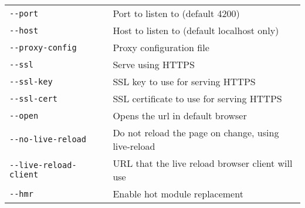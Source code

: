 \documentclass[8pt]{extarticle} %
\begin{document}
\begin{multicols}{3}
  \begin{tabular}{L{0.35\linewidth} L{0.65\linewidth}}
    \tt -{}-port \itt{} & \small Port to listen to (default 4200)\\
    \tt -{}-host \itt{} & \small Host to listen to (default localhost only)\\
    \tt -{}-proxy-config  & \small Proxy configuration file \\
    \tt -{}-ssl & \small Serve using HTTPS \\
    \tt -{}-ssl-key \itt{} & \small SSL key to use for serving HTTPS \\
    \tt -{}-ssl-cert \itt{} & \small SSL certificate to use for serving HTTPS \\
    \tt -{}-open & \small Opens the url in default browser \\
    \tt -{}-no-live-reload & \small Do not reload the page on change, using live-reload \\
    \tt -{}-live-reload-client \itt{} & \small URL that the live reload browser client will use \\
    \tt -{}-hmr & \small Enable hot module replacement
  \end{tabular}

\end{multicols}
\end{document}
